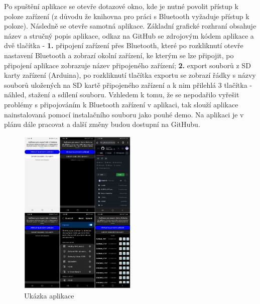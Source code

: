 \hspace{1 cm}
Po spuštění aplikace se otevře dotazové okno, kde je nutné povolit přístup k poloze zařízení (z důvodu že knihovna pro práci s Bluetooth vyžaduje přístup k poloze). Následně se otevře samotná aplikace. Základní grafické rozhraní obsahuje název a stručný popis aplikace, odkaz na GitHub se zdrojovým kódem aplikace a dvě tlačítka - \textbf{1.} připojení zařízení přes Bluetooth, které po rozkliknutí otevře nastavení Bluetooth a zobrazí okolní zařízení, ke kterým se lze připojit, po připojení aplikace zobrazuje název připojeného zařízení; \textbf{2.} export souborů z SD karty zařízení (Arduina), po rozkliknutí tlačítka exportu se zobrazí řádky s názvy souborů uložených na SD kartě připojeného zařízení a k nim přilehlá 3 tlačítka - náhled, stažení a sdílení souboru. Vzhledem k tomu, že se nepodařilo vyřešit problémy s připojováním k Bluetooth zařízení v aplikaci, tak slouží aplikace nainstalovaná pomocí instalačního souboru jako pouhé demo. Na aplikaci je v plánu dále pracovat a další změny budou dostupní na GitHubu.

\begin{figure}[H]
    \centering
    \includegraphics[width=0.5\textwidth]{images/navod_pouzivani.png}
    \caption{Ukázka aplikace}
\end{figure}